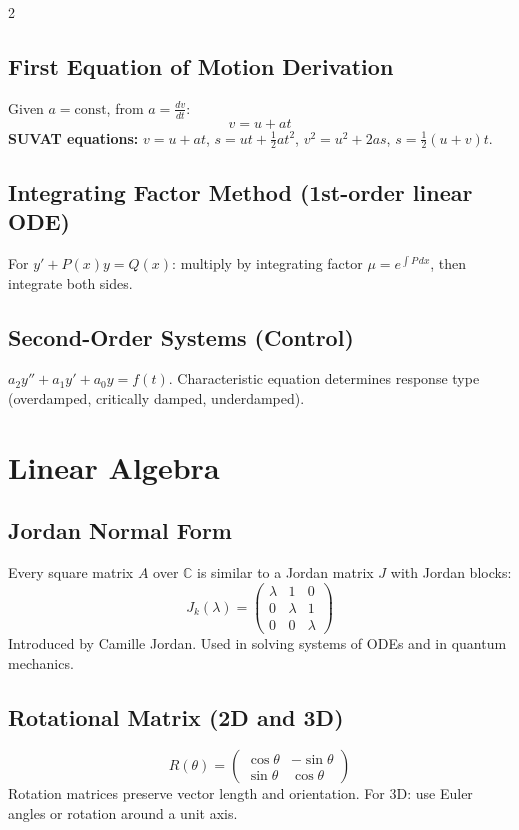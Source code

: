 \documentclass[10pt,a4paper]{article}
\begin{document}
\begin{multicols}{2}
\subsection{First Equation of Motion Derivation}
Given $a = \text{const}$, from $a = \frac{dv}{dt}$:
\[
v = u + at
\]
\textbf{SUVAT equations:} $v=u+at$, $s=ut+\tfrac{1}{2}at^2$, $v^2=u^2+2as$, $s=\tfrac{1}{2}(u+v)t$.

\subsection{Integrating Factor Method (1st-order linear ODE)}
For $y' + P(x)y = Q(x)$: multiply by integrating factor $\mu = e^{\int P\,dx}$, then integrate both sides.

\subsection{Second-Order Systems (Control)}
$a_2y'' + a_1y' + a_0y = f(t)$. Characteristic equation determines response type (overdamped, critically damped, underdamped).

\section{Linear Algebra}

\subsection{Jordan Normal Form}
Every square matrix $A$ over $\mathbb{C}$ is similar to a Jordan matrix $J$ with Jordan blocks:
\[
J_k(\lambda) = \begin{pmatrix} \lambda & 1 & 0 \\ 0 & \lambda & 1 \\ 0 & 0 & \lambda \end{pmatrix}
\]
Introduced by Camille Jordan. Used in solving systems of ODEs and in quantum mechanics.

\subsection{Rotational Matrix (2D and 3D)}
\[
R(\theta) = \begin{pmatrix}\cos\theta & -\sin\theta \\ \sin\theta & \cos\theta\end{pmatrix}
\]
Rotation matrices preserve vector length and orientation. For 3D: use Euler angles or rotation around a unit axis.


\end{multicols}
\end{document}
